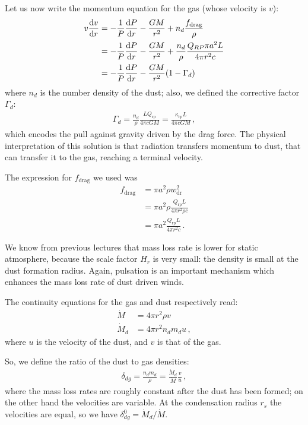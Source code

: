 \documentclass[main.tex]{subfiles}
\begin{document}
Let us now write the momentum equation for the gas (whose velocity is \(v\)): 
%
\begin{align}
v \dv{v}{r}
& =-\frac{1}{P} \dv{P}{r} - \frac{GM}{r^2}+n_d\frac{f_{\text{drag}}}{\rho} \\
&= -\frac{1}{P} \dv{P}{r} - \frac{GM}{r^2}+\frac{n_d}{\rho }\frac{Q_{RP}\pi a^2 L}{4\pi r^2 c}  \\
&=-\frac{1}{P} \dv{P}{r} - \frac{GM}{r^2}(1-\Gamma_d)
\end{align}
%
where \(n_d\) is the number density of the dust; also, we defined the corrective factor $\Gamma_d$: 
%
\begin{align}
\Gamma_{d} = \frac{n_d}{\rho } \frac{L Q _{\text{rp}} }{4 \pi c GM} = \frac{\kappa _{\text{rp}} L }{4 \pi c GM}
\,,
\end{align}
%
which encodes the pull against gravity driven by the drag force. 
The physical interpretation of this solution is that radiation transfers momentum to dust, that can transfer it to the gas, reaching a terminal velocity.

The expression for \(f _{\text{drag}}\) we used was 
%
\begin{align}
f _{\text{drag}} &= \pi a^2 \rho w _{\text{dr}}^2  \\
&= \pi a^2 \rho \frac{Q _{\text{rp}} L}{4 \pi r^2 \rho  c }  \\
&= \pi a^2 \frac{Q _{\text{rp}} L}{4 \pi r^2 c}
\,.
\end{align}

We know from previous lectures that mass loss rate is lower for static atmosphere, because the scale factor $H_r$ is very small: the density is small at the dust formation radius. 
Again, pulsation is an important mechanism which enhances the mass loss rate of dust driven winds.

The continuity equations for the gas and dust respectively read:
\begin{subequations}
\begin{align}
    \dot M&= 4\pi r^2 \rho v\\
    \dot M_d&=4\pi r^2 n_d m_d u\,,
\end{align}
\end{subequations}
%
where \(u\) is the velocity of the dust, and \(v\) is that of the gas.

So, we define the ratio of the dust to gas densities: 
%
\begin{align}
\delta_{dg} = \frac{n_d m_d}{\rho } = \frac{\dot{M}_{d}}{\dot{M}} \frac{v}{u}
\,,
\end{align}
%
where the mass loss rates are roughly constant after the dust has been formed; on the other hand the velocities are variable. At the condensation radius \(r_s\) the velocities are equal, so we have \(\delta^{0}_{dg} = \dot{M}_{d} / \dot{M}\).
\end{document}
